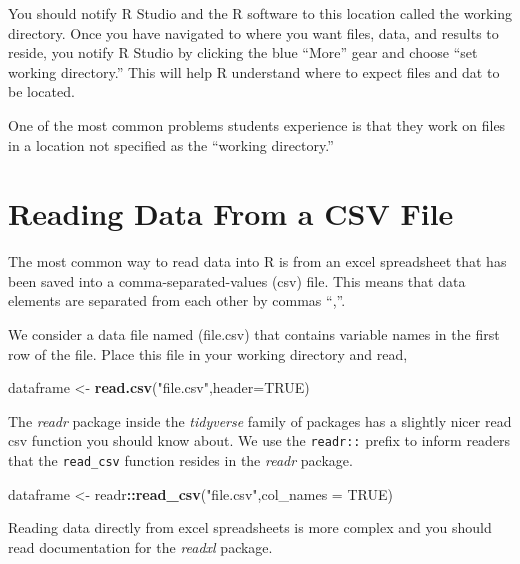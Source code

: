 \documentclass[]{book}
\newenvironment{Shaded}{\begin{snugshade}}{\end{snugshade}}
\newcommand{\KeywordTok}[1]{\textcolor[rgb]{0.13,0.29,0.53}{\textbf{#1}}}
\newcommand{\DataTypeTok}[1]{\textcolor[rgb]{0.13,0.29,0.53}{#1}}
\newcommand{\StringTok}[1]{\textcolor[rgb]{0.31,0.60,0.02}{#1}}
\newcommand{\OtherTok}[1]{\textcolor[rgb]{0.56,0.35,0.01}{#1}}
\newcommand{\OperatorTok}[1]{\textcolor[rgb]{0.81,0.36,0.00}{\textbf{#1}}}
\newcommand{\NormalTok}[1]{#1}
\begin{document}
You should notify R Studio and the R software to this location called
the working directory. Once you have navigated to where you want files,
data, and results to reside, you notify R Studio by clicking the blue
``More'' gear and choose ``set working directory.'' This will help R
understand where to expect files and dat to be located.

One of the most common problems students experience is that they work on
files in a location not specified as the ``working directory.''

\section{Reading Data From a CSV
File}\label{reading-data-from-a-csv-file}

The most common way to read data into R is from an excel spreadsheet
that has been saved into a comma-separated-values (csv) file. This means
that data elements are separated from each other by commas ``,''.

We consider a data file named (file.csv) that contains variable names in
the first row of the file. Place this file in your working directory and
read,

\begin{Shaded}
\begin{Highlighting}[]
\NormalTok{dataframe <-}\StringTok{ }\KeywordTok{read.csv}\NormalTok{(}\StringTok{"file.csv"}\NormalTok{,}\DataTypeTok{header=}\OtherTok{TRUE}\NormalTok{)}
\end{Highlighting}
\end{Shaded}

The \emph{readr} package inside the \emph{tidyverse} family of packages
has a slightly nicer read csv function you should know about. We use the
\texttt{readr::} prefix to inform readers that the \texttt{read\_csv}
function resides in the \emph{readr} package.

\begin{Shaded}
\begin{Highlighting}[]
\NormalTok{dataframe <-}\StringTok{ }\NormalTok{readr}\OperatorTok{::}\KeywordTok{read_csv}\NormalTok{(}\StringTok{"file.csv"}\NormalTok{,}\DataTypeTok{col_names =} \OtherTok{TRUE}\NormalTok{)}
\end{Highlighting}
\end{Shaded}

Reading data directly from excel spreadsheets is more complex and you
should read documentation for the \emph{readxl} package.
\end{document}
